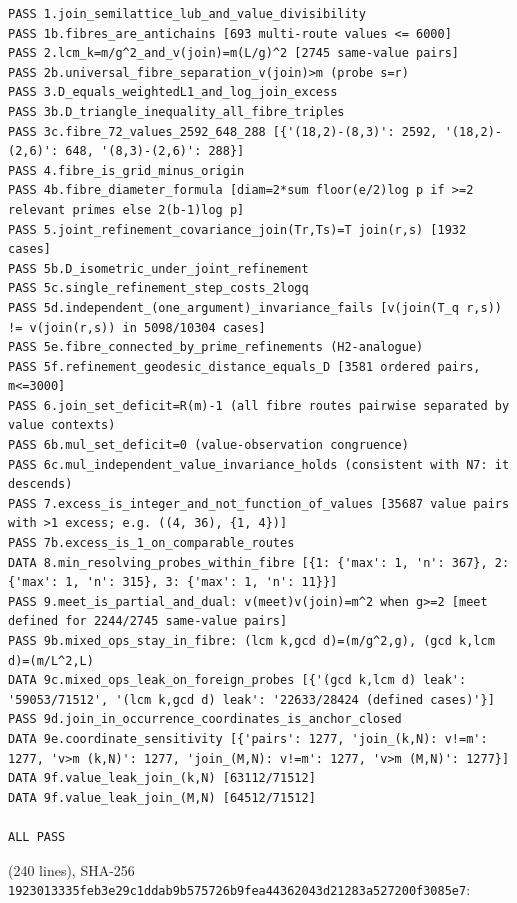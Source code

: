 \documentclass[11pt,a4paper]{article}
\theoremstyle{plain}
\theoremstyle{definition}
\begin{document}
\begin{lstlisting}[numbers=none,xleftmargin=0pt,basicstyle=\ttfamily\tiny,breaklines=true]
PASS 1.join_semilattice_lub_and_value_divisibility
PASS 1b.fibres_are_antichains [693 multi-route values <= 6000]
PASS 2.lcm_k=m/g^2_and_v(join)=m(L/g)^2 [2745 same-value pairs]
PASS 2b.universal_fibre_separation_v(join)>m (probe s=r)
PASS 3.D_equals_weightedL1_and_log_join_excess
PASS 3b.D_triangle_inequality_all_fibre_triples
PASS 3c.fibre_72_values_2592_648_288 [{'(18,2)-(8,3)': 2592, '(18,2)-(2,6)': 648, '(8,3)-(2,6)': 288}]
PASS 4.fibre_is_grid_minus_origin
PASS 4b.fibre_diameter_formula [diam=2*sum floor(e/2)log p if >=2 relevant primes else 2(b-1)log p]
PASS 5.joint_refinement_covariance_join(Tr,Ts)=T join(r,s) [1932 cases]
PASS 5b.D_isometric_under_joint_refinement
PASS 5c.single_refinement_step_costs_2logq
PASS 5d.independent_(one_argument)_invariance_fails [v(join(T_q r,s)) != v(join(r,s)) in 5098/10304 cases]
PASS 5e.fibre_connected_by_prime_refinements (H2-analogue)
PASS 5f.refinement_geodesic_distance_equals_D [3581 ordered pairs, m<=3000]
PASS 6.join_set_deficit=R(m)-1 (all fibre routes pairwise separated by value contexts)
PASS 6b.mul_set_deficit=0 (value-observation congruence)
PASS 6c.mul_independent_value_invariance_holds (consistent with N7: it descends)
PASS 7.excess_is_integer_and_not_function_of_values [35687 value pairs with >1 excess; e.g. ((4, 36), {1, 4})]
PASS 7b.excess_is_1_on_comparable_routes
DATA 8.min_resolving_probes_within_fibre [{1: {'max': 1, 'n': 367}, 2: {'max': 1, 'n': 315}, 3: {'max': 1, 'n': 11}}]
PASS 9.meet_is_partial_and_dual: v(meet)v(join)=m^2 when g>=2 [meet defined for 2244/2745 same-value pairs]
PASS 9b.mixed_ops_stay_in_fibre: (lcm k,gcd d)=(m/g^2,g), (gcd k,lcm d)=(m/L^2,L)
DATA 9c.mixed_ops_leak_on_foreign_probes [{'(gcd k,lcm d) leak': '59053/71512', '(lcm k,gcd d) leak': '22633/28424 (defined cases)'}]
PASS 9d.join_in_occurrence_coordinates_is_anchor_closed
DATA 9e.coordinate_sensitivity [{'pairs': 1277, 'join_(k,N): v!=m': 1277, 'v>m (k,N)': 1277, 'join_(M,N): v!=m': 1277, 'v>m (M,N)': 1277}]
DATA 9f.value_leak_join_(k,N) [63112/71512]
DATA 9f.value_leak_join_(M,N) [64512/71512]

ALL PASS
\end{lstlisting}
\par\smallskip\noindent{} (240 lines), SHA-256 \texttt{\scriptsize 1923013335feb3e29c1ddab9b575726b9fea44362043d21283a527200f3085e7}:
\end{document}

